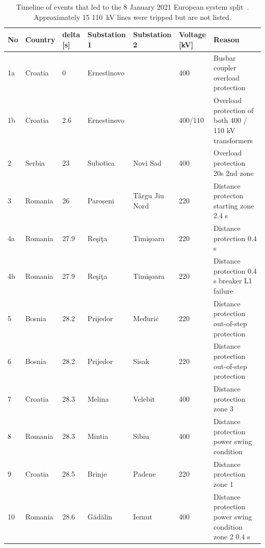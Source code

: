 \begin{table}
\centering
\caption{Timeline of events that led to the 8 January 2021 European system split~\cite{ENTSOESplitJan2021}. Approximately 15 110~kV lines were tripped but are not listed.}
\label{tab:split_timeline}
\begin{adjustbox}{max width=\textwidth}
\begin{tabular}{@{}lllllll@{}}
\toprule
No & Country & delta [s] & Substation 1 & Substation 2   & Voltage [kV] & Reason                                                 \\ \midrule
1a & Croatia & 0         & Ernestinovo  &                & 400          & Busbar coupler overload protection                     \\
1b & Croatia & 2.6       & Ernestinovo  &                & 400/110      & Overload protection of both 400 / 110 kV transformers  \\
2  & Serbia  & 23        & Subotica     & Novi Sad       & 400          & Overload protection 20s 2nd zone                       \\
3  & Romania & 26        & Paroșeni     & Târgu Jiu Nord & 220          & Distance protecton starting zone 2.4 s                 \\
4a & Romania & 27.9      & Reşiţa       & Timişoara      & 220          & Distance protection 0.4 s                              \\
4b & Romania & 27.9      & Reşiţa       & Timişoara      & 220          & Distance protection 0.4 s breaker L1 failure           \\
5  & Bosnia  & 28.2      & Prijedor     & Međuriċ        & 220          & Distance protection out-of-step protection             \\
6  & Bosnia  & 28.2      & Prijedor     & Sisak          & 220          & Distance protection out-of-step protection             \\
7  & Croatia & 28.3      & Melina       & Velebit        & 400          & Distance protection zone 3                             \\
8  & Romania & 28.3      & Mintia       & Sibiu          & 400          & Distance protection power swing condition              \\
9  & Croatia & 28.5      & Brinje       & Padene         & 220          & Distance protection zone 1                             \\
10 & Romania & 28.6      & Gădălin      & Iernut         & 400          & Distance protection power swing condition zone 2 0.4 s \\

\end{tabular}
\end{adjustbox}
\end{table}
